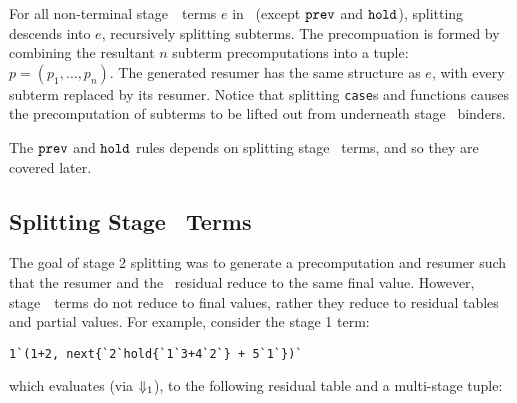 For all non-terminal stage~\bbtwo\ terms $e$ in \lang\ (except ${\tt prev}$ and ${\tt hold}$), splitting descends into $e$, recursively splitting subterms.  
The precompuation is formed by combining the resultant $n$ subterm precomputations into a tuple: $p=(p_1,\ldots,p_n)$.
The generated resumer has the same structure as $e$, with every subterm replaced by its resumer.
Notice that splitting \texttt{case}s and functions causes the precomputation of subterms to be lifted out from
underneath stage \bbtwo\ binders.  %

The ${\tt prev}$ and ${\tt hold}$ rules depends on
splitting stage \bbone\ terms, and so they are covered later.

%
%
%
%

\subsection{Splitting Stage \bbone\ Terms}

The goal of stage 2 splitting was to generate a precomputation and resumer such that the resumer and the \lang\ residual reduce to the same final value. However, stage~\bbone\ terms do not reduce to final values, rather they reduce to residual tables and partial values.  For example, consider the stage 1 term: 
\begin{lstlisting}
1`(1+2, next{`2`hold{`1`3+4`2`} + 5`1`})`
\end{lstlisting}
which evaluates (via $\mathbin{{\Downarrow_{ 1}}}$), to the following residual table and a multi-stage tuple:

